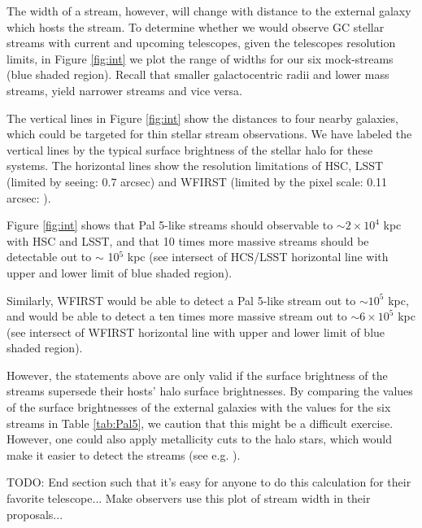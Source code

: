 \documentclass[twocolumn]{aastex62}
\newcommand{\todo}[1]{{\color{red} TODO: #1}}
\begin{document}
The width of a stream, however, will change with distance to the external galaxy which hosts the stream. To determine whether we would observe GC stellar streams with current and upcoming telescopes, given the telescopes resolution limits, in Figure \ref{fig:int} we plot the range of widths for our six mock-streams (blue shaded region). Recall that smaller galactocentric radii and lower mass streams, yield narrower streams and vice versa. %

The vertical lines in Figure \ref{fig:int} show the distances to four nearby galaxies, which could be targeted for thin stellar stream observations. We have labeled the vertical lines by the typical surface brightness of the stellar halo for these systems. The horizontal lines show the resolution limitations of HSC, LSST (limited by seeing: 0.7 arcsec) and WFIRST (limited by the pixel scale: 0.11 arcsec: \citealt{spergel13}).

Figure \ref{fig:int} shows that Pal 5-like streams should observable to $\sim 2\times 10^4$ kpc with HSC and LSST, and that 10 times more massive streams should be detectable out to $\sim$ 10$^5$ kpc (see intersect of HCS/LSST horizontal line with upper and lower limit of blue shaded region). 

Similarly, WFIRST would be able to detect a Pal 5-like stream out to $\sim 10^5$ kpc, and would be able to detect a ten times more massive stream out to $\sim 6 \times 10^5$ kpc (see intersect of WFIRST horizontal line with upper and lower limit of blue shaded region). 

However, the statements above are only valid if the surface brightness of the streams supersede their hosts' halo surface brightnesses. By comparing the values of the surface brightnesses of the external galaxies with the values for the six streams in Table \ref{tab:Pal5}, we caution that this might be a difficult exercise. However, one could also apply metallicity cuts to the halo stars, which would make it easier to detect the streams (see e.g. \citealt{ibata14}).

\todo{End section such that it's easy for anyone to do this calculation for their favorite telescope... Make observers use this plot of stream width in their proposals...}

\end{document}
